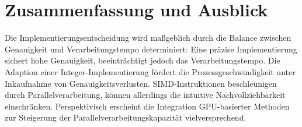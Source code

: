 \documentclass[course=erap]{aspdoc}
\begin{document}
\section{Zusammenfassung und Ausblick}
Die Implementierungsentscheidung wird maßgeblich durch die Balance zwischen Genauigkeit und Verarbeitungstempo determiniert: Eine präzise Implementierung sichert hohe Genauigkeit, beeinträchtigt jedoch das Verarbeitungstempo. Die Adaption einer Integer-Implementierung fördert die Prozessgeschwindigkeit unter Inkaufnahme von Genauigkeitsverlusten. SIMD-Instruktionen beschleunigen durch Parallelverarbeitung, können allerdings die intuitive Nachvollziehbarkeit einschränken.  Perspektivisch erscheint die Integration GPU-basierter Methoden zur Steigerung der Parallelverarbeitungskapazität vielversprechend.


\newpage

{}
\end{document}
